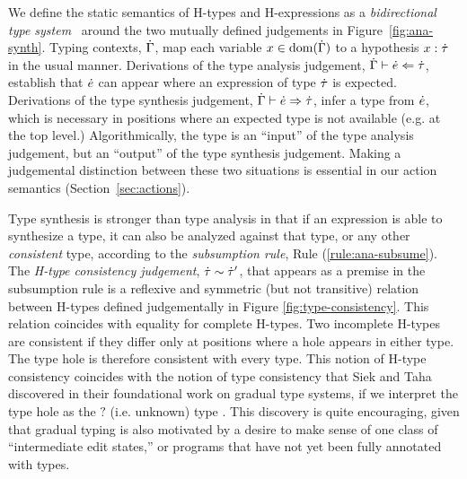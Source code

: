 We define the static semantics of H-types and H-expressions as a \emph{bidirectional type
  system}~\cite{Pierce:2000:LTI:345099.345100,DBLP:conf/icfp/DaviesP00,DBLP:conf/tldi/ChlipalaPH05,bidi-tutorial}
around the two mutually defined judgements in Figure~\ref{fig:ana-synth}. Typing contexts, $\dot{\Gamma}$, map each variable $x \in
\text{dom}(\dot{\Gamma})$ to a hypothesis $x : \dot{\tau}$ in the usual manner. 
%
Derivations of the type analysis judgement, $\dot{\Gamma} \vdash \dot{e} \Leftarrow \dot{\tau}$,
establish that $\dot{e}$ can appear where an expression of type $\dot{\tau}$ is
expected. Derivations of the type synthesis judgement,
$\dot{\Gamma} \vdash \dot{e} \Rightarrow \dot{\tau}$, infer a type from $\dot{e}$, which is
necessary in positions where an expected type is not available (e.g. at the
top level.) Algorithmically, the type is an ``input'' of the type analysis
judgement, but an ``output'' of the type synthesis judgement.  Making a
judgemental distinction between these two situations is essential in our
action semantics (Section~\ref{sec:actions}).

Type synthesis is stronger than type analysis in that if an expression is
able to synthesize a type, it can also be analyzed against that type, or
any other \emph{consistent} type, according to the \emph{subsumption rule},
Rule (\ref{rule:ana-subsume}). The \emph{H-type consistency judgement}, $\dot{\tau} \sim \dot{\tau}'$, that
appears as a premise in the subsumption rule is a reflexive and symmetric
(but not transitive) relation between H-types defined judgementally in
Figure \ref{fig:type-consistency}. This relation coincides with equality
for complete H-types. Two incomplete H-types are consistent if they differ
only at positions where a hole appears in either type. The type hole is
therefore consistent with every type. This notion of H-type consistency
coincides with the notion of type consistency that Siek and Taha discovered
in their foundational work on gradual type systems, if we interpret the
type hole as the $?$ (i.e. unknown) type \cite{Siek06a}. This discovery is quite encouraging, given that gradual typing is also motivated by a 
desire to make sense of one class of ``intermediate edit states,'' or programs that
have not yet been fully annotated with types.

